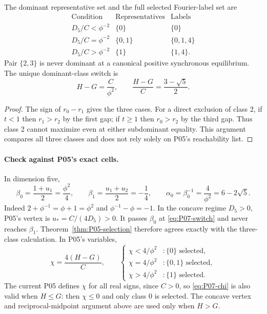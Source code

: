 \begin{corollary}
\label{cor:P07-selection}
The dominant representative set and the full selected Fourier-label set are
\begin{equation}
\begin{array}{c|c|c}
\text{Condition}&\text{Representatives}&\text{Labels}\\\hline
D_5/C<\phi^{-2}&\{0\}&\{0\}\\
D_5/C=\phi^{-2}&\{0,1\}&\{0,1,4\}\\
D_5/C>\phi^{-2}&\{1\}&\{1,4\}.
\end{array}
\label{eq:P07-selection}
\end{equation}
Pair $\{2,3\}$ is never dominant at a canonical positive synchronous
 equilibrium. The unique dominant-class switch is
\begin{equation}
 \boxed{H-G=\frac{C}{\phi^2},\qquad
         \frac{H-G}{C}=\frac{3-\sqrt5}{2}.}
 \label{eq:P07-switch}
\end{equation}
\end{corollary}
\begin{proof}
The sign of $r_0-r_1$ gives the three cases. For a direct exclusion
of class 2, if $t<1$ then $r_1>r_2$ by the first gap; if $t\ge1$
then $r_0>r_2$ by the third gap. Thus class 2 cannot maximize even
at either subdominant equality. This argument compares all three
classes and does not rely solely on P05's reachability list.
\end{proof}

\paragraph{Check against P05's exact cells.}
In dimension five,
\begin{equation}
 \beta_0=\frac{1+u_1}{2}=\frac{\phi^2}{4},\qquad
 \beta_1=\frac{u_1+u_2}{2}=-\frac14,\qquad
 \alpha_0=\beta_0^{-1}=\frac4{\phi^2}=6-2\sqrt5.
 \label{eq:P07-midpoints}
\end{equation}
Indeed $2+\phi^{-1}=\phi+1=\phi^2$ and
$\phi^{-1}-\phi=-1$. In the concave regime $D_5>0$, P05's
vertex is $u_*=C/(4D_5)>0$. It passes $\beta_0$ at
\eqref{eq:P07-switch} and never reaches $\beta_1$.
Theorem~\ref{thm:P05-selection} therefore agrees exactly with the
three-class calculation. In P05's variables,
\begin{equation}
 \chi=\frac{4(H-G)}C,\qquad
 \begin{cases}
 \chi<4/\phi^2 &: \{0\}\text{ selected},\\
 \chi=4/\phi^2 &: \{0,1\}\text{ selected},\\
 \chi>4/\phi^2 &: \{1\}\text{ selected}.
 \end{cases}
 \label{eq:P07-chi}
\end{equation}
The current P05 defines $\chi$ for all real signs, since $C>0$,
so \eqref{eq:P07-chi} is also valid when $H\le G$:
then $\chi\le0$ and only class 0 is selected. The concave vertex
and reciprocal-midpoint argument above are used only when $H>G$.


